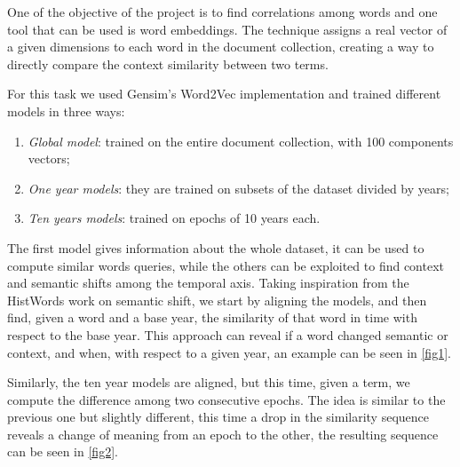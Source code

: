 One of the objective of the project is to find correlations among words and one tool 
that can be used is word embeddings. The technique assigns a real vector of a given dimensions
to each word in the document collection, creating a way to directly compare the context 
similarity between two terms.

For this task we used Gensim's Word2Vec implementation and trained different models 
in three ways:
\begin{enumerate}
    \item \emph{Global model}: trained on the entire document collection, with 100 components vectors;
    \item \emph{One year models}: they are trained on subsets of the dataset divided by years;
    \item \emph{Ten years models}: trained on epochs of 10 years each.
\end{enumerate}
The first model gives information about the whole dataset, it can be used to compute 
similar words queries, while the others can be exploited to find context and semantic shifts 
among the temporal axis.
Taking inspiration from the HistWords work on semantic shift, we start by aligning the models, 
and then find, given a word and a base year, the similarity of that word in time with respect 
to the base year. This approach can reveal if a word changed semantic or context, and when, 
with respect to a given year, an example can be seen in \vref{fig1}. 

Similarly, the ten year models are aligned, but this time, given a term, we compute the 
difference among two consecutive epochs. The idea is similar to the previous one but slightly 
different, this time a drop in the similarity sequence 
reveals a change of meaning from an epoch to the other, the resulting 
sequence can be seen in \vref{fig2}.

